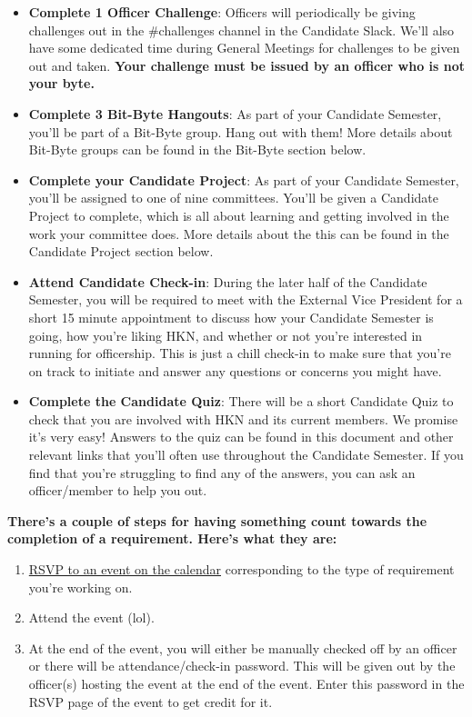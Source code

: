 \documentclass[11pt, article, oneside]{memoir}
\begin{document}
\begin{itemize}
                \item \textbf{Complete 1 Officer Challenge}: Officers will periodically be giving challenges out in the \#challenges channel in the Candidate Slack. We'll also have some dedicated time during General Meetings for challenges to be given out and taken. \textbf{Your challenge must be issued by an officer who is not your byte.}
                \item \textbf{Complete 3 Bit-Byte Hangouts}: As part of your Candidate Semester, you'll be part of a Bit-Byte group. Hang out with them! More details about Bit-Byte groups can be found in the Bit-Byte section below.
                \item \textbf{Complete your Candidate Project}: As part of your Candidate Semester, you'll be assigned to one of nine committees. You'll be given a Candidate Project to complete, which is all about learning and getting involved in the work your committee does. More details about the this can be found in the Candidate Project section below.
                \item \textbf{Attend Candidate Check-in}: During the later half of the Candidate Semester, you will be required to meet with the External Vice President for a short 15 minute appointment to discuss how your Candidate Semester is going, how you're liking HKN, and whether or not you're interested in running for officership. This is just a chill check-in to make sure that you're on track to initiate and answer any questions or concerns you might have.
                \item \textbf{Complete the Candidate Quiz}: There will be a short Candidate Quiz to check that you are involved with HKN and its current members. We promise it's very easy! Answers to the quiz can be found in this document and other relevant links that you'll often use throughout the Candidate Semester. If you find that you're struggling to find any of the answers, you can ask an officer/member to help you out.
            \end{itemize}


            \textbf{There's a couple of steps for having something count towards the completion of a requirement. Here's what they are:}
            \begin{enumerate}
                \item \href{https://hkn.mu/cal}{RSVP to an event on the calendar} corresponding to the type of requirement you're working on.
                \item Attend the event (lol).
                \item At the end of the event, you will either be manually checked off by an officer or there will be attendance/check-in password. This will be given out by the officer(s) hosting the event at the end of the event. Enter this password in the RSVP page of the event to get credit for it.
            \end{enumerate}
    
\end{document}

